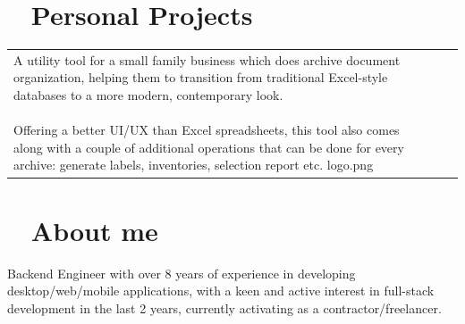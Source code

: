 \documentclass{modernsimplecv}
\newlength{\rightcolwidth}
\newlength{\leftcolwidth}
\begin{document}
\begin{paracol}{2}
{\begin{minipage}[t]{\leftcolwidth}
        \end{minipage}
    
    }
        \switchcolumn
    
        \begin{minipage}[t]{\rightcolwidth}
            \small
            \section*{\hspace{1mm}\faLaptop~ Personal Projects} 
            
            \begin{tabular}{p{3em} | p{} c}
                \personalproject{2023}{Archive Utilitary}{
                    \color{black!70}\footnotesize A utility tool for a small family business which does archive document organization, helping them to transition from traditional Excel-style databases to a more modern, contemporary look.\newline\newline
                    \color{black!70}\footnotesize Offering a better UI/UX than Excel spreadsheets, this tool also comes along with a couple of additional operations that can be done for every archive: generate labels, inventories, selection report etc.
                }{logo.png} \\
            \end{tabular}
        
        \end{minipage}
    
        \bigskip
    
        \begin{minipage}[t]{\rightcolwidth}
            \small
            \section*{\hspace{2mm}\faInfo~ About me}
            
            Backend Engineer with over 8 years of experience in developing desktop/web/mobile applications, with a keen and active interest in full-stack development in the last 2 years, currently activating as a contractor/freelancer.
        \end{minipage}
    
        \bigskip
    

\end{paracol}
\end{document}
